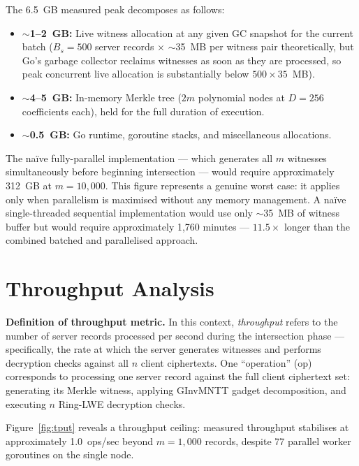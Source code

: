 The 6.5~GB measured peak decomposes as follows:
\begin{itemize}
    \item \textbf{$\sim$1--2~GB:} Live witness allocation at any given GC snapshot for the
          current batch ($B_s = 500$ server records $\times$ $\sim$35~MB per witness pair
          theoretically, but Go's garbage collector reclaims witnesses as soon as they are
          processed, so peak concurrent live allocation is substantially below $500 \times 35$~MB).
    \item \textbf{$\sim$4--5~GB:} In-memory Merkle tree ($2m$ polynomial nodes at $D = 256$
          coefficients each), held for the full duration of execution.
    \item \textbf{$\sim$0.5~GB:} Go runtime, goroutine stacks, and miscellaneous allocations.
\end{itemize}

The na\"{i}ve fully-parallel implementation --- which generates all $m$ witnesses
simultaneously before beginning intersection --- would require approximately 312~GB
at $m = 10{,}000$. This figure represents a genuine worst case: it applies only when
parallelism is maximised without any memory management. A na\"{i}ve single-threaded
sequential implementation would use only $\sim$35~MB of witness buffer but would
require approximately 1,760 minutes --- $11.5\times$ longer than the combined batched
and parallelised approach.

\section{Throughput Analysis}

\textbf{Definition of throughput metric.} In this context, \textit{throughput} refers
to the number of server records processed per second during the intersection phase ---
specifically, the rate at which the server generates witnesses and performs decryption
checks against all $n$ client ciphertexts. One ``operation'' (op) corresponds to processing
one server record against the full client ciphertext set: generating its Merkle witness,
applying GInvMNTT gadget decomposition, and executing $n$ Ring-LWE decryption checks.

Figure~\ref{fig:tput} reveals a throughput ceiling: measured throughput stabilises at
approximately 1.0~ops/sec beyond $m = 1{,}000$ records, despite 77 parallel worker
goroutines on the single node.

